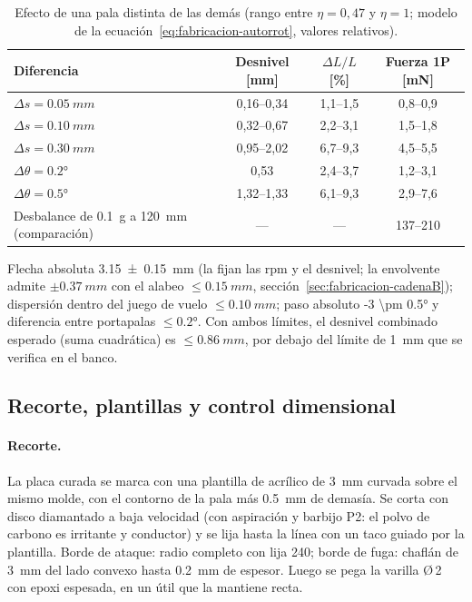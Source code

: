 \begin{table}[H]
\centering\small
\caption{Efecto de una pala distinta de las demás (rango entre $\eta=0{,}47$ y $\eta=1$;
modelo de la ecuación~\eqref{eq:fabricacion-autorrot}, valores relativos).}
\label{tab:fabricacion-track}
\begin{tabularx}{\textwidth}{@{}Yccc@{}}
\toprule
\textbf{Diferencia} & \textbf{Desnivel} [mm] & $\Delta L/L$ [\%] & \textbf{Fuerza 1P} [mN]\\\midrule
$\Delta s=\SI{0.05}{mm}$ & 0,16--0,34 & 1,1--1,5 & 0,8--0,9\\
$\Delta s=\SI{0.10}{mm}$ & 0,32--0,67 & 2,2--3,1 & 1,5--1,8\\
$\Delta s=\SI{0.30}{mm}$ & 0,95--2,02 & 6,7--9,3 & 4,5--5,5\\
$\Delta\theta=\ang{0.2}$ & 0,53 & 2,4--3,7 & 1,2--3,1\\
$\Delta\theta=\ang{0.5}$ & 1,32--1,33 & 6,1--9,3 & 2,9--7,6\\
\midrule
Desbalance de \SI{0.1}{g} a \SI{120}{mm} (comparación) & --- & --- & 137--210\\
\bottomrule
\end{tabularx}
\end{table}

\begin{resultado}
Flecha absoluta \SI{3.15 \pm 0.15}{mm} (la fijan las rpm y el desnivel; la envolvente admite
$\pm\SI{0.37}{mm}$ con el alabeo $\le\SI{0.15}{mm}$, sección~\ref{sec:fabricacion-cadenaB}); dispersión dentro del juego de vuelo $\le\SI{0.10}{mm}$; paso absoluto
\ang{-3 \pm 0.5} y diferencia entre portapalas $\le\ang{0.2}$. Con ambos límites, el
desnivel combinado esperado (suma cuadrática) es $\le\SI{0.86}{mm}$, por debajo del
límite de \SI{1}{mm} que se verifica en el banco.
\end{resultado}

\subsection{Recorte, plantillas y control dimensional}

\paragraph{Recorte.} La placa curada se marca con una plantilla de acrílico de
\SI{3}{mm} curvada sobre el mismo molde, con el contorno de la pala más \SI{0.5}{mm} de
demasía. Se corta con disco diamantado a baja velocidad (con aspiración y barbijo P2: el
polvo de carbono es irritante y conductor) y se lija hasta la línea con un taco guiado por
la plantilla. Borde de ataque: radio completo con lija 240; borde de fuga: chaflán de
\SI{3}{mm} del lado convexo hasta \SI{0.2}{mm} de espesor. Luego se pega la varilla Ø\,2
con epoxi espesada, en un útil que la mantiene recta.

